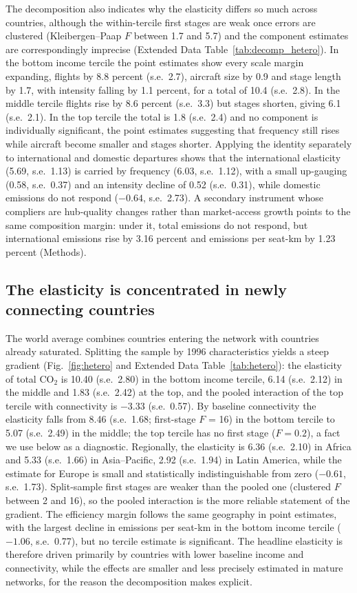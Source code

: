 \documentclass[12pt]{article}
\begin{document}
The decomposition also indicates why the elasticity differs so much
across countries, although the within-tercile first stages are weak once
errors are clustered (Kleibergen--Paap $F$ between 1.7 and 5.7) and the
component estimates are correspondingly imprecise (Extended Data
Table~\ref{tab:decomp_hetero}). In the bottom income tercile the point
estimates show every scale margin expanding, flights by 8.8 percent (s.e.\
2.7), aircraft size by 0.9 and stage length by 1.7, with intensity falling
by 1.1 percent, for a total of 10.4 (s.e.\ 2.8). In the middle tercile
flights rise by 8.6 percent (s.e.\ 3.3) but stages shorten, giving 6.1
(s.e.\ 2.1). In the top tercile the total is 1.8 (s.e.\ 2.4) and no
component is individually significant, the point estimates suggesting
that frequency still rises while aircraft become smaller and stages
shorter. Applying the identity separately to international and domestic
departures shows that the international elasticity (5.69, s.e.\ 1.13) is
carried by frequency (6.03, s.e.\ 1.12), with a small up-gauging (0.58,
s.e.\ 0.37) and an intensity decline of 0.52 (s.e.\ 0.31), while domestic
emissions do not respond ($-0.64$, s.e.\ 2.73). A secondary instrument whose compliers are
hub-quality changes rather than market-access growth points to the same
composition margin: under it, total emissions do not respond, but
international emissions rise by 3.16 percent and emissions per seat-km by
1.23 percent (Methods).

\subsection*{The elasticity is concentrated in newly connecting countries}
The world average combines countries entering the network with countries
already saturated. Splitting the sample by 1996 characteristics yields a
steep gradient (Fig.~\ref{fig:hetero} and Extended Data
Table~\ref{tab:hetero}): the elasticity of total CO$_2$ is 10.40 (s.e.\
2.80) in the bottom income tercile, 6.14 (s.e.\ 2.12) in the middle and
1.83 (s.e.\ 2.42) at the top, and the pooled interaction of the top
tercile with connectivity is $-3.33$ (s.e.\ 0.57). By baseline
connectivity the elasticity falls from 8.46 (s.e.\ 1.68; first-stage $F$ =
16) in the bottom tercile to 5.07 (s.e.\ 2.49) in the middle; the top
tercile has no first stage ($F = 0.2$), a fact we use below as a
diagnostic. Regionally, the elasticity is 6.36 (s.e.\ 2.10) in Africa and
5.33 (s.e.\ 1.66) in Asia--Pacific, 2.92 (s.e.\ 1.94) in Latin America,
while the estimate for Europe is small and statistically
indistinguishable from zero ($-0.61$, s.e.\ 1.73). Split-sample first stages are
weaker than the pooled one (clustered $F$ between 2 and 16), so the pooled
interaction is the more reliable statement of the gradient. The efficiency
margin follows the same geography in point estimates, with the largest
decline in emissions per seat-km in the bottom income tercile ($-1.06$,
s.e.\ 0.77), but no tercile estimate is significant. The headline elasticity is therefore driven primarily by
countries with lower baseline income and connectivity, while the effects
are smaller and less precisely estimated in mature networks, for the
reason the decomposition makes explicit.
\end{document}
